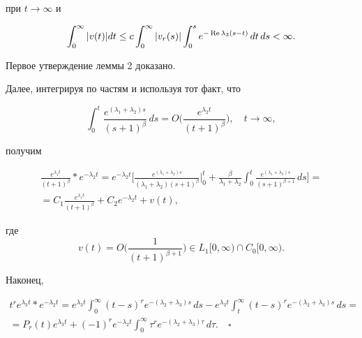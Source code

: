 при $t \rightarrow \infty$ и


$$


\int_0^\infty |v(t)|dt \leq c


\int_0^\infty |v_r(s)| \int_0^se^{-\re \lambda_3(s-t)}\,dt\,ds< \infty.


$$


Первое утверждение леммы 2 доказано.





Далее, интегрируя по частям и используя тот факт, что


$$


\int_0^t \frac{e^{( \lambda_1+\lambda_2)s}}{(s+1)^\beta}\,ds=O


\bigg(\frac{e^{ \lambda_2t}}{(t+1)^\beta}\bigg),\quad t \rightarrow \infty,


$$


получим


\begin{multline*}


\frac{e^{\lambda_1t}}{(t+1)^\beta} \ast e^{-\lambda_2t}=e^{-\lambda_2t}


\bigg[\frac{e^{( \lambda_1+\lambda_2)s}}


{( \lambda_1+\lambda_2)(s+1)^\beta}\bigg|_0^t+


\frac{\beta}{\lambda_1+\lambda_2} \int_0^t \frac{e^{( \lambda_1+\lambda_2)s}}


{(s+1)^{\beta +1}}\,ds\bigg]=\\


%


=C_1 \frac{e^{\lambda_1t}}{(t+1)^\beta}+C_2 e^{-\lambda_2t}


+v(t),


\end{multline*}


где $$


v(t)=O\bigg(\frac{1}{(t+1)^{\beta +1}}\bigg) \in L_1[0, \infty) \cap C_0


[0, \infty).


$$





Наконец,


\begin{multline*}


t^r e^{\lambda_3t} \ast e^{-\lambda_2 t}= e^{\lambda_3t} \int_0^\infty


(t-s)^r e^{-(\lambda_2 + \lambda_3)s} \,ds - e^{\lambda_3t} \int_t^


\infty (t-s)^r e^{-(\lambda_2 + \lambda_3)s} \,ds =\\


%


=P_r (t) e^{\lambda_3t}


+(-1)^r e^{-\lambda_2 t} \int_0^\infty \tau^r e^{-(\lambda_2 + \lambda_3)


\tau }\, d \tau.\quad\square


\end{multline*}





